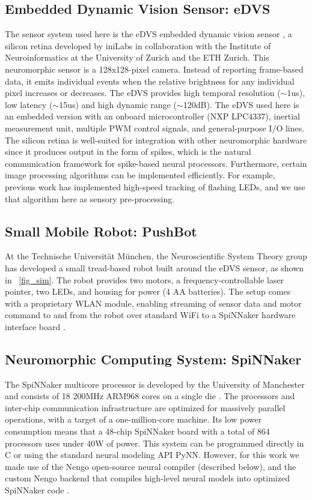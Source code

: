 \documentclass{frontiersSCNS}
\begin{document}
\subsection{Embedded Dynamic Vision Sensor: eDVS}
The sensor system used here is the eDVS embedded dynamic vision 
sensor \citep{conradt2009embedded}, a silicon retina developed by iniLabs in 
collaboration with the Institute of Neuroinformatics at the University of 
Zurich and the ETH Zurich. This neuromorphic sensor is a 128x128-pixel camera. 
Instead of reporting frame-based data, it emits individual events when the 
relative brightness for any individual pixel increases or decreases. The eDVS 
provides high temporal resolution ($\sim$1us), low latency ($\sim$15us) and high dynamic 
range ($\sim$120dB). The eDVS used here is an embedded version with an onboard 
microcontroller (NXP LPC4337), inertial measurement unit, multiple PWM control 
signals, and general-purpose I/O lines. The silicon retina is well-suited for 
integration with other neuromorphic hardware since it produces output in the 
form of spikes, which is the natural communication framework for spike-based 
neural processors. Furthermore, certain image processing algorithms can be 
implemented efficiently. For example, previous work \citep{muller2011miniature} 
has implemented high-speed tracking of flashing LEDs, and we use that algorithm 
here as sensory pre-processing.


\subsection{Small Mobile Robot: PushBot}
At the Technische Universit{\"a}t M{\"u}nchen, the Neuroscientific
System Theory group has developed a small tread-based robot built around the 
eDVS sensor, as shown in \figurename~\ref{fig_sim}. The robot provides two motors, a frequency-controllable laser pointer, two LEDs, and housing for power (4 AA batteries). The setup comes with a proprietary WLAN module, enabling streaming of sensor data and motor command to and from the robot over standard WiFi to a SpiNNaker hardware interface board \citep{denk2013}.


\subsection{Neuromorphic Computing System: SpiNNaker}

The SpiNNaker multicore processor is developed by the University of Manchester 
and consists of 18 200MHz ARM968 cores on a single die \citep{furber2007neural, furber2014spinnaker}. 
The processors and inter-chip communication infrastructure are optimized for
massively parallel operations, with a target of a one-million-core machine.  Its
low power consumption means that a 48-chip SpiNNaker board with a total of 
864 processors uses under 40W of power. This system can be programmed directly 
in C or using the standard neural modeling API PyNN. However, for this work
we made use of the Nengo open-source neural compiler \citep{bekolay_nengo2014} 
(described below), and the custom Nengo backend that compiles high-level
neural models into optimized SpiNNaker code \citep{mundy2015}.
\end{document}
